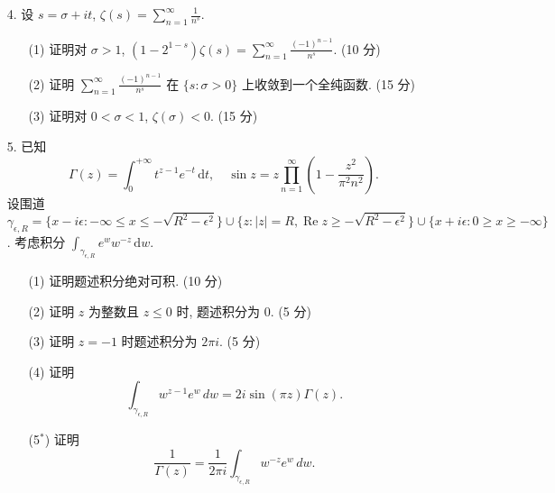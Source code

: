 \begin{enumerate}
\item[4.] 设 $s = \sigma + it$, $\zeta(s) = \sum \limits_{n=1}^\infty \frac{1}{n^s}$.
\begin{itemize}
    \item[(1)] 证明对 $\sigma > 1$, $(1 - 2^{1 - s}) \zeta(s) = \sum \limits_{n=1}^\infty \frac{(-1)^{n-1}}{n^s}$. (10 分)
    \item[(2)] 证明 $\sum \limits_{n=1}^\infty \frac{(-1)^{n-1}}{n^s}$ 在 $\{ s : \sigma > 0 \}$ 上收敛到一个全纯函数. (15 分)
    \item[(3)] 证明对 $0 < \sigma < 1$, $\zeta(\sigma) < 0$. (15 分)
\end{itemize}

\item[5.] 已知\[\Gamma(z) = \int_0^{+\infty} t^{z-1} e^{-t} \, \mathrm{d}t, 
\quad\sin z = z \prod \limits_{n=1}^\infty \left( 1 - \frac{z^2}{\pi^2 n^2} \right).\]
设围道 $\gamma_{\epsilon, R} = \{ x - i \epsilon : -\infty \leq x \leq -\sqrt{R^2 - \epsilon^2} \} 
\cup \{ z : |z| = R, \operatorname{Re} z \geq -\sqrt{R^2 - \epsilon^2} \} 
\cup \{ x + i \epsilon : 0 \geq x \geq -\infty \}$.
考虑积分 $\displaystyle\int_{\gamma_{\epsilon, R}} e^{w} w^{-z} \, \mathrm{d}w$.
\begin{itemize}
    \item[(1)] 证明题述积分绝对可积. (10 分)
    \item[(2)] 证明 $z$ 为整数且 $z \leq 0$ 时, 题述积分为 $0$. (5 分)
    \item[(3)] 证明 $z = -1$ 时题述积分为 $2 \pi i$. (5 分)
    \item[(4)] 证明
    \[\int_{\gamma_{\epsilon,R}} w^{z-1} e^w \, dw = 2i \sin(\pi z) \Gamma(z).\]
    \item[(5$^*$)] 证明
    \[\frac{1}{\Gamma(z)} = \frac{1}{2\pi i} \int_{\gamma_{\epsilon,R}} w^{-z} e^w \, dw.\]
\end{itemize}
\end{enumerate}

